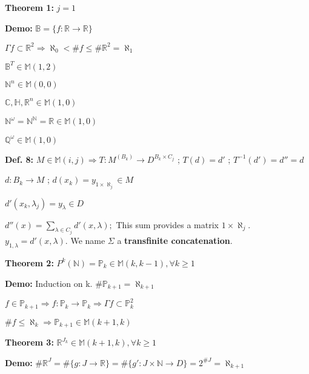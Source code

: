 \documentclass[10pt,a4paper]{article}
\begin{document}
\vspace{3mm}

\textbf{Theorem 1:} $j = 1$

\textbf{Demo:} $\mathbb{B} = \{ f : \mathbb{R} \rightarrow \mathbb{R} \}$

$\Gamma f \subset \mathbb{R}^2 \Rightarrow \aleph_0 < \# f \le \# \mathbb{R}^2 = \aleph_1$

\vspace{3mm}

$\mathbb{B}^T \in \mathbb{M}(1, 2)$

$\mathbb{N}^n \in \mathbb{M}(0,0)$

$\mathbb{C}, \mathbb{H}, \mathbb{R}^n \in \mathbb{M}(1, 0)$

$\mathbb{N}^\omega = \mathbb{N}^\mathbb{N} = \mathbb{R} \in \mathbb{M}(1, 0)$

$\mathbb{Q}^\omega \in \mathbb{M}(1, 0)$

\vspace{3mm}

\textbf{Def. 8:} $M \in \mathbb{M}(i,j) \Rightarrow T : M^{(B_k)} \rightarrow D ^ {B_k \times C_j} $ ; $T(d) = d'$ ; $T^{-1}(d') = d'' = d$

$d : B_k \rightarrow M$ ; $d(x_k) = y_{1 \times \aleph_j} \in M$

$d'(x_k, \lambda_j) = y_\lambda \in D$

$d''(x) = \sum\limits_{\lambda \in C_j} d'(x, \lambda) ;$ This sum provides a matrix $1 \times \aleph_j$. $y_{1,\lambda} = d'(x, \lambda)$. We name $\Sigma$ a \textbf{transfinite concatenation}.

\vspace{3mm}

\textbf{Theorem 2:} $P^k(\mathbb{N}) = \mathbb{P}_k \in \mathbb{M}(k, k-1), \forall k \ge 1$

\textbf{Demo:} Induction on k. $\# \mathbb{P}_{k + 1} = \aleph_{k + 1}$

$f \in \mathbb{P}_{k + 1} \Rightarrow f : \mathbb{P}_k \rightarrow \mathbb{P}_k \Rightarrow \Gamma f \subset \mathbb{P}_k^2$

$\# f \le \aleph_k \Rightarrow \mathbb{P}_{k + 1} \in \mathbb{M}(k + 1, k)$

\vspace{3mm}

\textbf{Theorem 3:} $\mathbb{R}^{J_k} \in \mathbb{M}(k + 1, k), \forall k \ge 1$

\textbf{Demo:} $\# \mathbb{R}^J = \# \{ g : J \rightarrow \mathbb{R} \} = \# \{ g' : J \times \mathbb{N} \rightarrow D \} = 2^{\#J} = \aleph_{k+1}$
\end{document}
